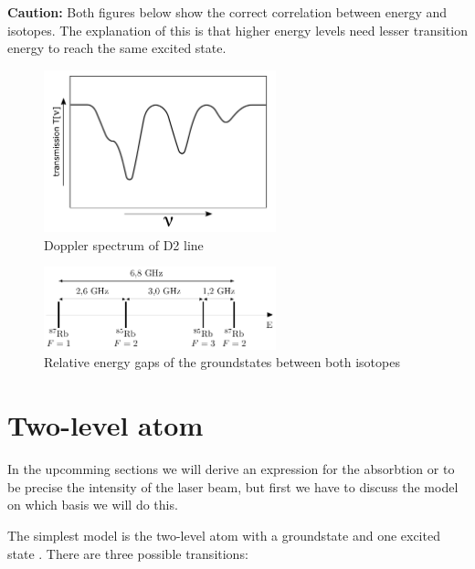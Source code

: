 \textbf{Caution:} Both figures below show the correct correlation between energy and isotopes. The explanation of this is that higher
energy levels need lesser transition energy to reach the same excited state. 

\vspace{\fill}

\begin{figure}[h]
\centering
\includegraphics[width=0.6\textwidth]{spectrum_doppler}
\caption{Doppler spectrum of D2 line}
\label{fig:doppler} 
\end{figure}

\vspace{\fill}
\pagebreak

\begin{figure}[h]
\centering
\includegraphics[width=0.6\textwidth]{groundstate}
\caption{Relative energy gaps of the groundstates between both isotopes}
\label{fig:gap} 
\end{figure}

\section{Two-level atom} %

In the upcomming sections we will derive an expression for the absorbtion or to be precise the
intensity of the laser beam, but first we have to discuss the model on which basis we will do this.
\bigskip

The simplest model is the two-level atom with a groundstate  and one excited state . There are three
possible transitions:
\bigskip

